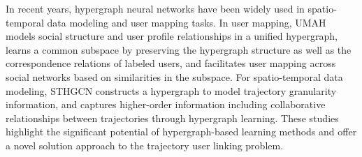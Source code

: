 In recent years, hypergraph neural networks have been widely used in spatio-temporal data modeling and user mapping tasks. In user mapping, UMAH \cite{hguid} models social structure and user profile relationships in a unified hypergraph, learns a common subspace by preserving the hypergraph structure as well as the correspondence relations of labeled users, and facilitates user mapping across social networks based on similarities in the subspace. For spatio-temporal data modeling, STHGCN \cite{hypoi} constructs a hypergraph to model trajectory granularity information, and captures higher-order information including collaborative relationships between trajectories through hypergraph learning. These studies highlight the significant potential of hypergraph-based learning methods and offer a novel solution approach to the trajectory user linking problem.